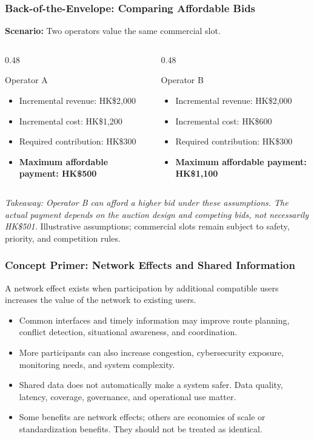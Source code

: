 \documentclass{beamer}
\begin{document}
\begin{frame}[t,shrink=11]
\frametitle{Back-of-the-Envelope: Comparing Affordable Bids}
\textbf{Scenario:} Two operators value the same commercial slot.
\begin{columns}[T]
\begin{column}{0.48\textwidth}\begin{block}{Operator A}
\begin{itemize}
\item Incremental revenue: HK\$2,000
\item Incremental cost: HK\$1,200
\item Required contribution: HK\$300
\item \textbf{Maximum affordable payment: HK\$500}
\end{itemize}\end{block}\end{column}
\begin{column}{0.48\textwidth}\begin{block}{Operator B}
\begin{itemize}
\item Incremental revenue: HK\$2,000
\item Incremental cost: HK\$600
\item Required contribution: HK\$300
\item \textbf{Maximum affordable payment: HK\$1,100}
\end{itemize}\end{block}\end{column}
\end{columns}
\textit{Takeaway: Operator B can afford a higher bid under these assumptions. The actual payment depends on the auction design and competing bids, not necessarily HK\$501.}
\vfill{\tiny Illustrative assumptions; commercial slots remain subject to safety, priority, and competition rules.}
\end{frame}

\begin{frame}[t]
\frametitle{Concept Primer: Network Effects and Shared Information}
A network effect exists when participation by additional compatible users increases the value of the network to existing users.
\begin{itemize}
\item Common interfaces and timely information may improve route planning, conflict detection, situational awareness, and coordination.
\item More participants can also increase congestion, cybersecurity exposure, monitoring needs, and system complexity.
\item Shared data does not automatically make a system safer. Data quality, latency, coverage, governance, and operational use matter.
\item Some benefits are network effects; others are economies of scale or standardization benefits. They should not be treated as identical.
\end{itemize}
\end{frame}
\end{document}
